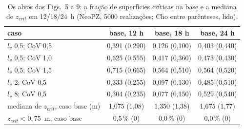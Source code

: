 \begin{table}[htbp]\centering\footnotesize\setlength{\tabcolsep}{4pt}
\caption{Os alvos das Figs.~5 a 9: a fração de superfícies críticas na base e a mediana de $z_{crit}$ em 12/18/24~h (NeoPZ, 5000 realizações; Cho entre parênteses, lido).}\label{tab:alvos}
\begin{tabular}{lccc}\toprule
caso & base, 12 h & base, 18 h & base, 24 h \\\midrule
$l_v$ 0,5; CoV 0,5 & 0{,}391 (0{,}290) & 0{,}126 (0{,}100) & 0{,}403 (0{,}440) \\
$l_v$ 0,5; CoV 1,0 & 0{,}625 (0{,}555) & 0{,}417 (0{,}360) & 0{,}473 (0{,}430) \\
$l_v$ 0,5; CoV 1,5 & 0{,}715 (0{,}665) & 0{,}564 (0{,}510) & 0{,}564 (0{,}520) \\
$l_v$ 2; CoV 0,5 & 0{,}333 (0{,}255) & 0{,}097 (0{,}130) & 0{,}485 (0{,}510) \\
$l_v$ 8; CoV 0,5 & 0{,}304 (0{,}235) & 0{,}077 (0{,}150) & 0{,}529 (0{,}540) \\
\midrule mediana de $z_{crit}$, caso base (m) & 1{,}075 (1{,}08) & 1{,}350 (1{,}38) & 1{,}675 (1{,}77) \\
$z_{crit} < 0{,}75$~m, caso base & 0{,}5\,\% (0) & 0{,}0\,\% (0) & 0{,}0\,\% (0) \\
\bottomrule\end{tabular}\end{table}
